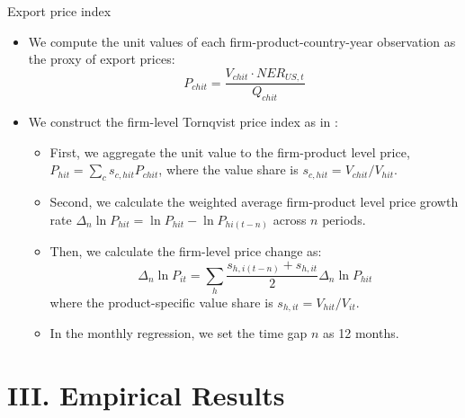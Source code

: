 \documentclass[10pt]{beamer}
\begin{document}
\begin{frame}{Export price index}
    \begin{itemize}
	\item We compute the unit values of each firm-product-country-year observation as the proxy of export prices:
        $$
        P_{chit}=\frac{V_{chit}\cdot NER_{US,t}}{Q_{chit}}
        $$
        \item We construct the firm-level Tornqvist price index as in \cite{smeets2013estimating}:
        \begin{itemize}
            \item First, we aggregate the unit value to the firm-product level price, $P_{hit}=\sum_c s_{c,hit} P_{chit}$, where the value share is $s_{c,hit}=V_{chit}/V_{hit}$.
            \item Second, we calculate the weighted average firm-product level price growth rate $\Delta_n \ln P_{hit} = \ln P_{hit}- \ln P_{hi(t-n)}$ across $n$ periods.
            \item Then, we calculate the firm-level price change as: 
            $$
            \Delta_n \ln P_{it} = \sum _{h} \frac{s_{h,i(t-n)}+s_{h,it}}{2} \Delta_n \ln P_{hit}
            $$
            where the product-specific value share is $s_{h,it}=V_{hit}/V_{it}$.
            \item In the monthly regression, we set the time gap $n$ as 12 months.
        \end{itemize}
    \end{itemize}
\end{frame}

\section{III. Empirical Results}
\end{document}
